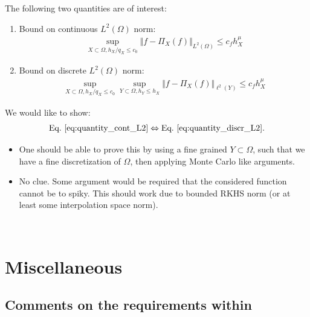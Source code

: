 \documentclass[a4paper, 10pt]{article}
\begin{document}
\noindent The following two quantities are of interest:
\begin{enumerate}
\item Bound on continuous $L^2(\Omega)$ norm:
\begin{align}
\label{eq:quantity_cont_L2}
\sup_{X \subset \Omega, h_X / q_X \leq c_0} \Vert f - \Pi_X(f) \Vert_{L^2(\Omega)} \leq c_f h_X^{\mu}
\end{align}
\item Bound on discrete $L^2(\Omega)$ norm:
\begin{align}
\label{eq:quantity_discr_L2}
\sup_{X \subset \Omega, h_X / q_X \leq c_0} \sup_{Y \subset \Omega, h_Y \leq h_X} \Vert f - \Pi_X(f) \Vert_{\ell^2(Y)} \leq c_f h_X^{\mu}
\end{align}
\end{enumerate}
We would like to show:
\begin{align*}
\text{Eq.\ } \eqref{eq:quantity_cont_L2} \Leftrightarrow \text{Eq.\ } \eqref{eq:quantity_discr_L2}.
\end{align*}

\begin{itemize}
\item["$\Leftarrow$"] One should be able to prove this by using a fine grained $Y \subset \Omega$, such that we have a fine discretization of $\Omega$, then applying Monte Carlo like arguments.
\item["$\Rightarrow$"] No clue. 
Some argument would be required that the considered function cannot be to spiky.
This should work due to bounded RKHS norm (or at least some interpolation space norm).
\end{itemize}


~ \newpage 


\section{Miscellaneous}

\subsection{Comments on the requirements within }
\end{document}
